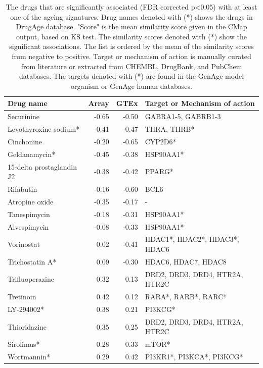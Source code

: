 \documentclass[12pt,twoside]{unicam}
\begin{document}
\begin{longtable}[t]{lrr>{\raggedright\arraybackslash}p{6cm}}
\caption[Drugs significantly associated with the ageing signatures.]{\label{tab:drugTable1}The drugs that are significantly associated (FDR corrected p<0.05) with at least one of the ageing signatures. Drug names denoted with (*) shows the drugs in DrugAge database. "Score" is the mean similarity score given in the CMap output, based on KS test. The similarity scores denoted with (*) show the significant associations. The list is ordered by the mean of the similarity scores from negative to positive. Target or mechanism of action is manually curated from literature or extracted from CHEMBL, DrugBank, and PubChem databases. The targets denoted with (*) are found in the GenAge model organism or GenAge human databases.}\\
\toprule
Drug name & Array & GTEx & Target or Mechanism of action\\
\midrule
\rowcolor{gray!6}  Securinine & -0.65 & -0.50 & GABRA1-5, GABRB1-3\\
Levothyroxine sodium* & -0.41 & -0.47 & THRA, THRB*\\
\rowcolor{gray!6}  Cinchonine & -0.20 & -0.65 & CYP2D6*\\
Geldanamycin* & -0.45 & -0.38 & HSP90AA1*\\
\rowcolor{gray!6}  15-delta prostaglandin J2 & -0.38 & -0.42 & PPARG*\\
\addlinespace
Rifabutin & -0.16 & -0.60 & BCL6\\
\rowcolor{gray!6}  Atropine oxide & -0.35 & -0.17 & -\\
Tanespimycin & -0.18 & -0.31 & HSP90AA1*\\
\rowcolor{gray!6}  Alvespimycin & -0.08 & -0.33 & HSP90AA1*\\
Vorinostat & 0.02 & -0.41 & HDAC1*, HDAC2*, HDAC3*, HDAC6\\
\addlinespace
\rowcolor{gray!6}  Trichostatin A* & 0.09 & -0.30 & HDAC6, HDAC7, HDAC8\\
Trifluoperazine & 0.32 & 0.13 & DRD2, DRD3, DRD4, HTR2A, HTR2C\\
\rowcolor{gray!6}  Tretinoin & 0.42 & 0.12 & RARA*, RARB*, RARC*\\
LY-294002* & 0.38 & 0.21 & PI3KCG*\\
\rowcolor{gray!6}  Thioridazine & 0.35 & 0.25 & DRD2, DRD3, DRD4, HTR2A, HTR2C\\
\addlinespace
Sirolimus* & 0.28 & 0.33 & mTOR*\\
\rowcolor{gray!6}  Wortmannin* & 0.29 & 0.42 & PI3KR1*, PI3KCA*, PI3KCG*\\

\end{longtable}
\end{document}
